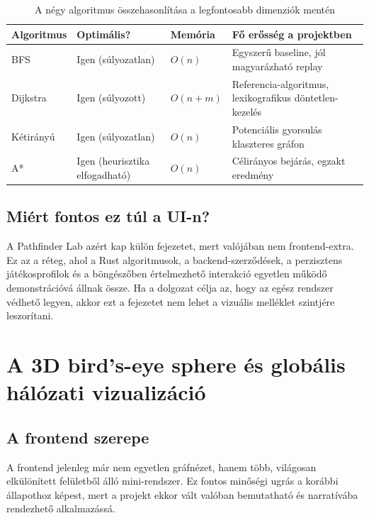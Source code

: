 ﻿\documentclass[a4paper,12pt]{report}
\begin{document}
\begin{table}[H]
\centering
\caption{A négy algoritmus összehasonlítása a legfontosabb dimenziók mentén}
\begin{tabularx}{\textwidth}{>{\raggedright\arraybackslash}p{3cm} >{\raggedright\arraybackslash}p{2.5cm} >{\raggedright\arraybackslash}X >{\raggedright\arraybackslash}X}
\toprule
\textbf{Algoritmus} & \textbf{Optimális?} & \textbf{Memória} & \textbf{Fő erősség a projektben} \\
\midrule
BFS & Igen (súlyozatlan) & $O(n)$ & Egyszerű baseline, jól magyarázható replay \\
Dijkstra & Igen (súlyozott) & $O(n + m)$ & Referencia-algoritmus, lexikografikus döntetlen-kezelés \\
Kétirányú & Igen (súlyozatlan) & $O(n)$ & Potenciális gyorsulás klaszteres gráfon \\
A* & Igen (heurisztika elfogadható) & $O(n)$ & Célirányos bejárás, egzakt eredmény \\
\bottomrule
\end{tabularx}
\end{table}

\section{Miért fontos ez túl a UI-n?}

A Pathfinder Lab azért kap külön fejezetet, mert valójában nem frontend-extra. Ez az a réteg, ahol a Rust algoritmusok, a backend-szerződések, a perzisztens játékosprofilok és a böngészőben értelmezhető interakció egyetlen működő demonstrációvá állnak össze. Ha a dolgozat célja az, hogy az egész rendszer védhető legyen, akkor ezt a fejezetet nem lehet a vizuális melléklet szintjére leszorítani.

\chapter{A 3D bird's-eye sphere és globális hálózati vizualizáció}

\section{A frontend szerepe}

A frontend jelenleg már nem egyetlen gráfnézet, hanem több, világosan elkülönített felületből álló mini-rendszer. Ez fontos minőségi ugrás a korábbi állapothoz képest, mert a projekt ekkor vált valóban bemutatható és narratívába rendezhető alkalmazássá.
\end{document}
